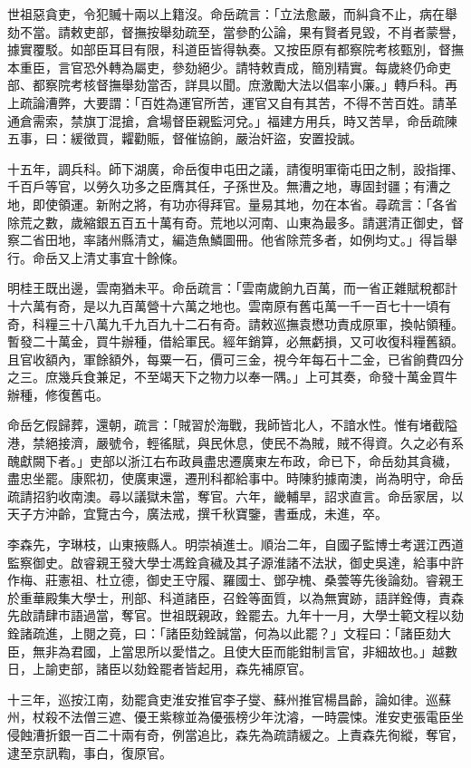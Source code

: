 \begin{pinyinscope}
世祖惡貪吏，令犯贓十兩以上籍沒。命岳疏言：「立法愈嚴，而糾貪不止，病在舉劾不當。請敕吏部，督撫按舉劾疏至，當參酌公論，果有賢者見毀，不肖者蒙譽，據實覆駁。如部臣耳目有限，科道臣皆得執奏。又按臣原有都察院考核甄別，督撫本重臣，言官恐外轉為屬吏，參劾絕少。請特敕責成，簡別精實。每歲終仍命吏部、都察院考核督撫舉劾當否，詳具以聞。庶激勵大法以倡率小廉。」轉戶科。再上疏論漕弊，大要謂：「百姓為運官所苦，運官又自有其苦，不得不苦百姓。請革通倉需索，禁旗丁混搶，倉場督臣親監河兌。」福建方用兵，時又苦旱，命岳疏陳五事，曰：緩徵買，糶勸賑，督催協餉，嚴治奸盜，安置投誠。

十五年，調兵科。師下湖廣，命岳復申屯田之議，請復明軍衛屯田之制，設指揮、千百戶等官，以勞久功多之臣膺其任，子孫世及。無漕之地，專固封疆；有漕之地，即使領運。新附之將，有功亦得拜官。量易其地，勿在本省。尋疏言：「各省除荒之數，歲縮銀五百五十萬有奇。荒地以河南、山東為最多。請選清正御史，督察二省田地，率諸州縣清丈，編造魚鱗圖冊。他省除荒多者，如例均丈。」得旨舉行。命岳又上清丈事宜十餘條。

明桂王既出邊，雲南猶未平。命岳疏言：「雲南歲餉九百萬，而一省正雜賦稅都計十六萬有奇，是以九百萬營十六萬之地也。雲南原有舊屯萬一千一百七十一頃有奇，科糧三十八萬九千九百九十二石有奇。請敕巡撫袁懋功責成原軍，換帖領種。暫發二十萬金，買牛辦種，借給軍民。經年銷算，必無虧損，又可收復科糧舊額。且官收額內，軍餘額外，每粟一石，價可三金，視今年每石十二金，已省餉費四分之三。庶幾兵食兼足，不至竭天下之物力以奉一隅。」上可其奏，命發十萬金買牛辦種，修復舊屯。

命岳乞假歸葬，還朝，疏言：「賊習於海戰，我師皆北人，不諳水性。惟有堵截隘港，禁絕接濟，嚴號令，輕徭賦，與民休息，使民不為賊，賊不得資。久之必有系醜獻闕下者。」吏部以浙江右布政員盡忠遷廣東左布政，命已下，命岳劾其貪穢，盡忠坐罷。康熙初，使廣東還，遷刑科都給事中。時陳豹據南澳，尚為明守，命岳疏請招豹收南澳。尋以議獄未當，奪官。六年，畿輔旱，詔求直言。命岳家居，以天子方沖齡，宜覽古今，廣法戒，撰千秋寶鑒，書垂成，未進，卒。

李森先，字琳枝，山東掖縣人。明崇禎進士。順治二年，自國子監博士考選江西道監察御史。啟睿親王發大學士馮銓貪穢及其子源淮諸不法狀，御史吳達，給事中許作梅、莊憲祖、杜立德，御史王守履、羅國士、鄧孕槐、桑蕓等先後論劾。睿親王於重華殿集大學士，刑部、科道諸臣，召銓等面質，以為無實跡，語詳銓傳，責森先啟請肆市語過當，奪官。世祖既親政，銓罷去。九年十一月，大學士範文程以劾銓諸疏進，上閱之竟，曰：「諸臣劾銓誠當，何為以此罷？」文程曰：「諸臣劾大臣，無非為君國，上當思所以愛惜之。且使大臣而能鉗制言官，非細故也。」越數日，上諭吏部，諸臣以劾銓罷者皆起用，森先補原官。

十三年，巡按江南，劾罷貪吏淮安推官李子燮、蘇州推官楊昌齡，論如律。巡蘇州，杖殺不法僧三遮、優王紫稼並為優張榜少年沈濬，一時震悚。淮安吏張電臣坐侵蝕漕折銀一百二十兩有奇，例當追比，森先為疏請緩之。上責森先徇縱，奪官，逮至京訊鞫，事白，復原官。


\end{pinyinscope}
